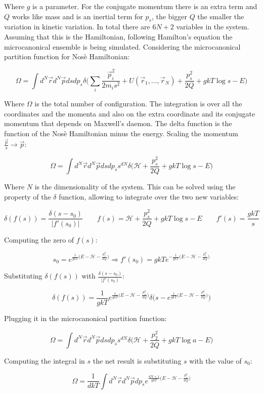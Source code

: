 Where $g$ is a parameter.
For the conjugate momentum there is an extra term and $Q$ works like mass and is an inertial term for $p_s$, the bigger $Q$ the smaller the variation in kinetic variation.
In total there are $6N + 2$ variables in the system.
Assuming that this is the Hamiltonian, following Hamilton's equation the microcanonical ensemble is being simulated.
Considering the microcanonical partition function for Nos\`e Hamiltonian:

$$\Omega = \int d^N\vec{r}d^N\vec{p}dsdp_s\delta\biggl(\sum\limits_{i}\frac{\vec{p}_i^2}{2m_is^2} + U(\vec{r}_1, \dots, \vec{r}_N) + \frac{p_s^2}{2Q} + gkT\log s - E\biggr)$$

Where $\Omega$ is the total number of configuration.
The integration is over all the coordinates and the momenta and also on the extra coordinate and its conjugate momentum that depends on Maxwell's daemon.
The delta function is the function of the Nos\`e Hamiltonian minus the energy.
Scaling the momentum $\frac{\vec{p}}{s}\rightarrow \vec{p}$:

$$\Omega = \int d^N\vec{r}d^N\vec{p}dsdp_ss^{dN}\delta\biggl(\mathcal{H}+\frac{p_s^2}{2Q} + gkT\log s - E\biggr)$$

Where $N$ is the dimensionality of the system.
This can be solved using the property of the $\delta$ function, allowing to integrate over the two new variables:

$$\delta(f(s)) = \frac{\delta(s-s_0)}{|f'(s_0)|}\qquad f(s) = \mathcal{H}+\frac{p_s^2}{2Q} + gkT\log s - E\qquad f'(s) = \frac{gkT}{s}$$

Computing the zero of $f(s)$:

$$s_0 = e^{\frac{1}{gkT}\bigl(E-\mathcal{H}-\frac{p_s^2}{2Q}\bigr)}\Rightarrow f'(s_0) = gkTe^{-\frac{1}{gkT}\bigl(E-\mathcal{H}-\frac{p_s^2}{2Q}\bigr)}$$

Substituting $\delta(f(s))$ with $\frac{\delta(s-s_0)}{|f'(s_0)}$:

$$\delta(f(s)) = \frac{1}{gkT}e^{\frac{1}{gkT}\bigl(E-\mathcal{H}-\frac{p_s^2}{2Q}\bigr)}\delta\biggl(s-e^{\frac{1}{gkT}\bigl(E-\mathcal{H}-\frac{p_s^2}{2Q}\bigr)}\biggr)$$

Plugging it in the microcanonical partition function:

$$\Omega = \int d^N\vec{r}d^N\vec{p}dsdp_ss^{dN}\delta\biggl(\mathcal{H}+\frac{p_2^2}{2Q}+gkT\log a-E\biggr)$$

Computing the integral in $s$ the net result is substituting $s$ with the value of $s_0$:

$$\Omega = \frac{1}{dkT}\int d^N\vec{r}d^N\vec{p}dp_se^{\frac{dN+1}{gkT}\bigl(E-\mathcal{H}-\frac{p_s^2}{2Q}\bigr)}$$

